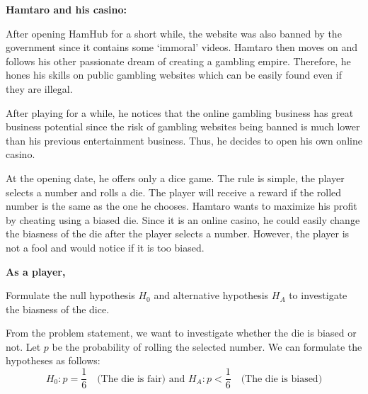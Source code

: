 \documentclass[a4paper, 10pt]{article}
\begin{document}
\begin{tosubmit}
\problem[4]
\textbf{Hamtaro and his casino:}

\vspace{2mm}

\par\hspace{3mm} After opening HamHub for a short while, the website was also banned by the government since it contains some `immoral' videos.
Hamtaro then moves on and follows his other passionate dream of creating a gambling empire.
Therefore, he hones his skills on public gambling websites which can be easily found even if they are illegal.

\vspace{1mm}

\par\hspace{3mm} After playing for a while, he notices that the online gambling business has great business potential since the risk of gambling websites being banned is much lower than his previous entertainment business.
Thus, he decides to open his own online casino.

\vspace{1mm}

\par\hspace{3mm} At the opening date, he offers only a dice game.
The rule is simple, the player selects a number and rolls a die.
The player will receive a reward if the rolled number is the same as the one he chooses.
Hamtaro wants to maximize his profit by cheating using a biased die.
Since it is an online casino, he could easily change the biasness of the die after the player selects a number.
However, the player is not a fool and would notice if it is too biased.

\vspace{5mm}
\par\noindent \textbf{As a player,}

\begin{subproblems}
    \item Formulate the null hypothesis \( H_0 \) and alternative hypothesis \( H_A \) to investigate the biasness of the dice.
\end{subproblems}

\par\noindent\submitsolution
From the problem statement, we want to investigate whether the die is biased or not.
Let \( p \) be the probability of rolling the selected number.
We can formulate the hypotheses as follows:
\[ \boxed{ H_0: p = \frac{1}{6} \quad \text{(The die is fair) and } H_A: p < \frac{1}{6} \quad \text{(The die is biased)} } \]


\end{tosubmit}
\end{document}

